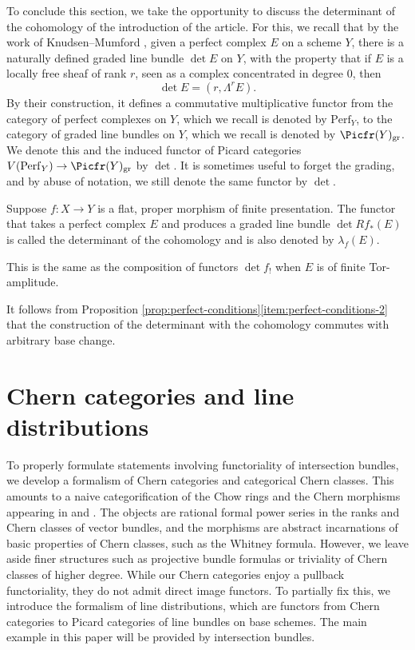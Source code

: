 To conclude this section, we take the opportunity to discuss the determinant of the cohomology of the introduction of the article. For this, we recall that by the work of Knudsen--Mumford \cite{KnudsenMumford}, given a perfect complex $E$ on a scheme $Y$, there is a naturally defined graded line bundle $\det E$ on $Y$, with the property that if $E$ is a locally free sheaf of rank $r$, seen as a complex concentrated in degree 0, then
\begin{displaymath}
\det E = (r, \Lambda^{r} E).
\end{displaymath}
By their construction, it defines a commutative multiplicative functor from the category of perfect complexes on $Y$, which we recall is denoted by $\mathrm{Perf}_{Y}$, to the category of graded line bundles on $Y$, which we recall is denoted by $\Picfr(Y)_{\mathrm{gr}}$. We denote this and the induced functor of Picard categories $V(\mathrm{Perf}_{Y}) \to \Picfr(Y)_{\mathrm{gr}}$ by $\det$. It is sometimes useful to forget the grading, and by abuse of notation, we still denote the same functor by $\det$.

\begin{definition}\label{def:detcoh}
Suppose $f: X \to Y$ is a flat, proper morphism of finite presentation. The functor that takes a perfect complex $E$ and produces a graded line bundle $\det Rf_{\ast} (E)$ is called the determinant of the cohomology and is also denoted by $\lambda_{f}(E)$.

This is the same as the composition of functors $\det f_!$ when $E$ is of finite Tor-amplitude.
\end{definition}

It follows from Proposition \ref{prop:perfect-conditions}\eqref{item:perfect-conditions-2} that the construction of the determinant with the cohomology commutes with arbitrary base change.

\section{Chern categories and line distributions}\label{subsection:Chern-categories}

To properly formulate statements involving functoriality of intersection bundles, we develop a formalism of Chern categories and categorical Chern classes. This amounts to a naive categorification of the Chow rings and the Chern morphisms appearing in \cite{SGA6} and \cite{FultonLang}. The objects are rational formal power series in the ranks and Chern classes of vector bundles, and the morphisms are abstract incarnations of basic properties of Chern classes, such as the Whitney formula. However, we leave aside finer structures such as projective bundle formulas or triviality of Chern classes of higher degree. While our Chern categories enjoy a pullback functoriality, they do not admit direct image functors. To partially fix this, we introduce the formalism of line distributions, which are functors from Chern categories to Picard categories of line bundles on base schemes. The main example in this paper will be provided by intersection bundles.


